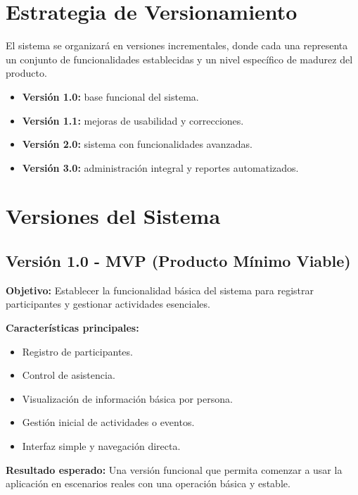 \documentclass[11pt,a4paper]{article}
\begin{document}
\section{Estrategia de Versionamiento}
El sistema se organizará en versiones incrementales, donde cada una representa un conjunto de funcionalidades establecidas y un nivel específico de madurez del producto.\par

\begin{itemize}[leftmargin=1.5em]
    \item \textbf{Versión 1.0:} base funcional del sistema.
    \item \textbf{Versión 1.1:} mejoras de usabilidad y correcciones.
    \item \textbf{Versión 2.0:} sistema con funcionalidades avanzadas.
    \item \textbf{Versión 3.0:} administración integral y reportes automatizados.
\end{itemize}

\section{Versiones del Sistema}

\subsection{Versión 1.0 - MVP (Producto Mínimo Viable)}
\textbf{Objetivo:}\newline
Establecer la funcionalidad básica del sistema para registrar participantes y gestionar actividades esenciales.

\textbf{Características principales:}
\begin{itemize}[leftmargin=1.5em]
    \item Registro de participantes.
    \item Control de asistencia.
    \item Visualización de información básica por persona.
    \item Gestión inicial de actividades o eventos.
    \item Interfaz simple y navegación directa.
\end{itemize}

\textbf{Resultado esperado:}\newline
Una versión funcional que permita comenzar a usar la aplicación en escenarios reales con una operación básica y estable.
\end{document}
